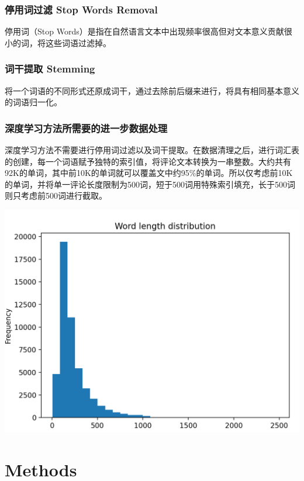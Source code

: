 \documentclass{article}
\begin{document}
\subsubsection{停用词过滤 Stop Words Removal}
停用词（Stop Words）是指在自然语言文本中出现频率很高但对文本意义贡献很小的词，将这些词语过滤掉。
\subsubsection{词干提取 Stemming}
将一个词语的不同形式还原成词干，通过去除前后缀来进行，将具有相同基本意义的词语归一化。
\subsubsection{深度学习方法所需要的进一步数据处理}\label{sssec:2.2.4}
深度学习方法不需要进行停用词过滤以及词干提取。在数据清理之后，进行词汇表的创建，每一个词语赋予独特的索引值，将评论文本转换为一串整数。大约共有92K的单词，其中前10K的单词就可以覆盖文中约95\%的单词。所以仅考虑前10K的单词，并将单一评论长度限制为500词，短于500词用特殊索引填充，长于500词则只考虑前500词进行截取。
\begin{center}
\includegraphics[scale=0.7]{PNG1.png}
\end{center}

\section{Methods}
\end{document}
